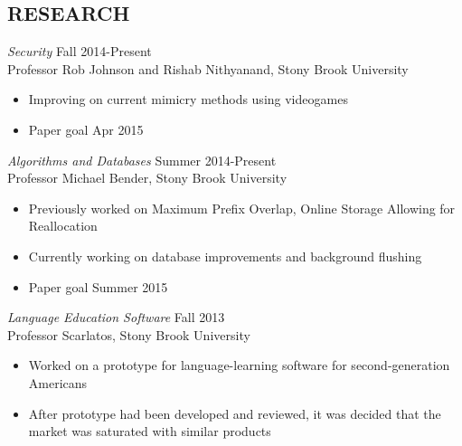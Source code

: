 \documentclass[margin]{res}
\begin{document}
\begin{resume}
 

               
\section{RESEARCH}
			  {\sl Security} \hfill		Fall 2014-Present \\
			  Professor Rob Johnson and Rishab Nithyanand, Stony Brook University \\
                \begin{itemize} \itemsep -2pt
			  \item Improving on current mimicry methods using videogames 
			  \item Paper goal Apr 2015 
			  \end{itemize}

			  {\sl Algorithms and Databases} \hfill		Summer 2014-Present \\
			  Professor Michael Bender, Stony Brook University\\
                \begin{itemize} \itemsep -2pt
			  \item Previously worked on Maximum Prefix Overlap, Online Storage Allowing for Reallocation 
			  \item Currently working on database improvements and background flushing 
			  \item Paper goal Summer 2015 
			  \end{itemize}

			  {\sl Language Education Software} \hfill			Fall 2013 \\
			  Professor Scarlatos, Stony Brook University \\
                \begin{itemize} \itemsep -2pt
			  \item Worked on a prototype for language-learning software for second-generation Americans 
			  \item After prototype had been developed and reviewed, it was decided that the market was saturated with similar products 
			  \end{itemize}
			  

\end{resume}
\end{document}
